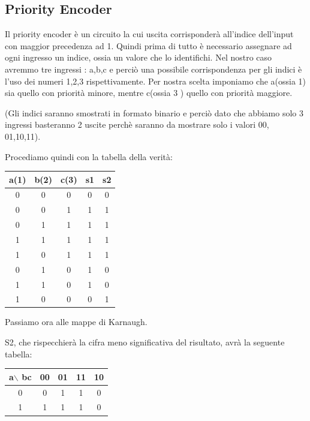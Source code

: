 \documentclass[a4paper]{book}
\begin{document}
\subsection{Priority Encoder}

Il priority encoder è un circuito la cui uscita corrisponderà all'indice dell'input con maggior precedenza ad 1. 
Quindi prima di tutto è necessario assegnare ad ogni ingresso un indice, ossia un valore che lo identifichi.
Nel nostro caso avremmo tre ingressi : a,b,c e perciò una possibile corrispondenza per gli indici è l'uso dei numeri 1,2,3 rispettivamente. Per nostra scelta imponiamo che a(ossia 1) sia quello con priorità minore, mentre c(ossia 3 ) quello con priorità maggiore.

(Gli indici saranno smostrati in formato binario e perciò dato che abbiamo solo 3 ingressi basteranno 2 uscite perchè saranno da mostrare solo i valori 00, 01,10,11).

Procediamo quindi con la tabella della verità:

\begin{tabular}{|c|c|c|c|c|}
a(1) & b(2) & c(3) & s1 & s2 \\
\hline
0 & 0 & 0 & 0 & 0 \\
\hline
0 & 0 & 1 & 1 & 1 \\
\hline
0 & 1 & 1 & 1 & 1 \\
\hline
1 & 1 & 1 & 1 & 1 \\
\hline
1 & 0 & 1 & 1 & 1 \\
\hline
0 & 1 & 0 & 1 & 0 \\
\hline
1 & 1 & 0 & 1 & 0 \\
\hline
1 & 0 & 0 & 0 & 1 \\
\hline

\end{tabular}

Passiamo ora alle mappe di Karnaugh.

S2, che rispecchierà la cifra meno significativa del risultato, avrà la seguente tabella:

\begin{tabular}{|c|c|c|c|c|}
a$\backslash$ bc & 00 & 01 & 11 & 10 \\
\hline
0              & 0  & \cellcolor{yellow}1  &  \cellcolor{yellow}1 & 0  \\
\hline
1              & \cellcolor{yellow}1  & \cellcolor{yellow}1  &  \cellcolor{yellow}1 & 0  \\
\hline

\end{tabular}
\end{document}
